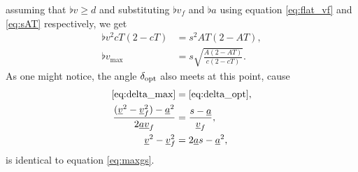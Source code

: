 assuming that $\flat{v} \ge d$ and substituting $\flat{v}_f$ and $\flat{a}$ using equation \eqref{eq:flat_vf} and \eqref{eq:sAT} respectively, we get
\begin{align*}
\flat{v}^2 cT(2 - cT) &= s^2 AT(2 - AT),\\
\flat{v}_{\max} &= s \sqrt{\frac{A(2 - AT)}{c(2 - cT)}}.
\end{align*}
As one might notice, the angle $\delta_{\operatorname{opt}}$ also meets at this point, cause
\begin{align*}
\eqref{eq:delta_max} &= \eqref{eq:delta_opt},\\
\frac{(\flat{v}^2 - \flat{v}_f^2) - \flat{a}^2}{2 \flat{a} \flat{v}_f} &= \frac{s - \flat{a}}{\flat{v}_f},\\
\flat{v}^2 - \flat{v}_f^2 &= 2 \flat{a} s - \flat{a}^2,
\end{align*}
is identical to equation \eqref{eq:maxgs}.